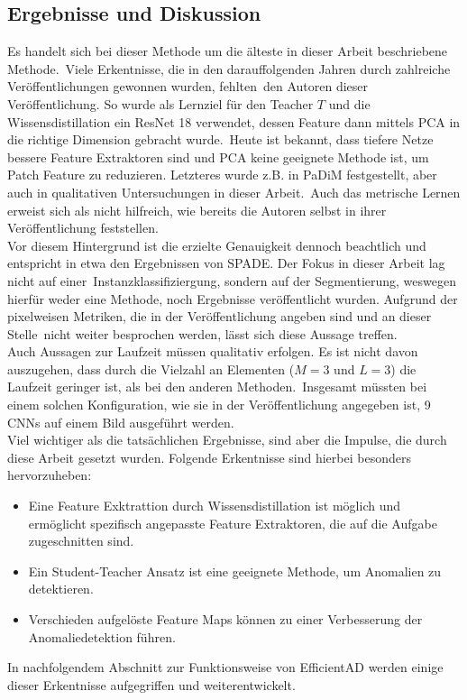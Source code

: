 \subsection{Ergebnisse und Diskussion}
Es handelt sich bei dieser Methode um die älteste in dieser Arbeit beschriebene Methode.\
Viele Erkentnisse, die in den darauffolgenden Jahren durch zahlreiche Veröffentlichungen gewonnen wurden, fehlten\
den Autoren dieser Veröffentlichung. So wurde als Lernziel für den Teacher $T$ und die Wissensdistillation ein ResNet 18 verwendet, dessen Feature dann mittels PCA in die richtige Dimension gebracht wurde.\
Heute ist bekannt, dass tiefere Netze bessere Feature Extraktoren sind und PCA keine geeignete Methode ist, um Patch Feature zu reduzieren. Letzteres wurde z.B. in PaDiM festgestellt, aber auch in qualitativen Untersuchungen in dieser Arbeit.\
Auch das metrische Lernen erweist sich als nicht hilfreich, wie bereits die Autoren selbst in ihrer Veröffentlichung feststellen.\\
Vor diesem Hintergrund ist die erzielte Genauigkeit dennoch beachtlich und entspricht in etwa den Ergebnissen von SPADE. Der Fokus in dieser Arbeit lag nicht auf einer\
Instanzklassifiziergung, sondern auf der Segmentierung, weswegen hierfür weder eine Methode, noch Ergebnisse veröffentlicht wurden. Aufgrund der pixelweisen Metriken, die in der Veröffentlichung angeben sind und an dieser Stelle\
nicht weiter besprochen werden, lässt sich diese Aussage treffen.\\
Auch Aussagen zur Laufzeit müssen qualitativ erfolgen. Es ist nicht davon auszugehen, dass durch die Vielzahl an Elementen ($M=3$ und $L=3$) die Laufzeit geringer ist, als bei den anderen Methoden.\
Insgesamt müssten bei einem solchen Konfiguration, wie sie in der Veröffentlichung angegeben ist, 9 CNNs auf einem Bild ausgeführt werden.\\
Viel wichtiger als die tatsächlichen Ergebnisse, sind aber die Impulse, die durch diese Arbeit gesetzt wurden. Folgende Erkentnisse sind hierbei besonders hervorzuheben:\
\begin{itemize}
    \item Eine Feature Exktrattion durch Wissensdistillation ist möglich und ermöglicht spezifisch angepasste Feature Extraktoren, die auf die Aufgabe zugeschnitten sind.\
    \item Ein Student-Teacher Ansatz ist eine geeignete Methode, um Anomalien zu detektieren.\
    \item Verschieden aufgelöste Feature Maps können zu einer Verbesserung der Anomaliedetektion führen.\
\end{itemize}
In nachfolgendem Abschnitt zur Funktionsweise von EfficientAD werden einige dieser Erkentnisse aufgegriffen und weiterentwickelt.\
